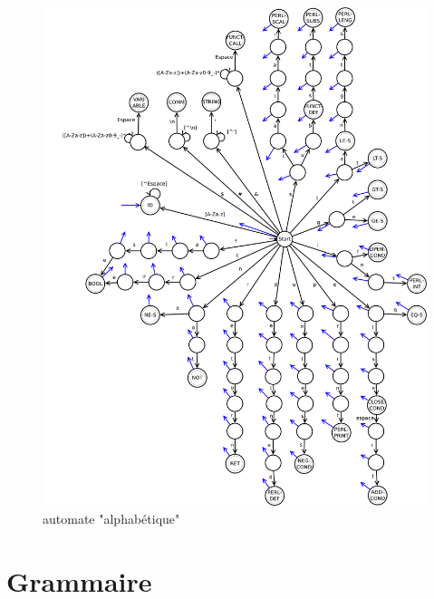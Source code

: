 \documentclass[a4paper,10pt]{article}
\begin{document}
  \begin{figure}[H] \hspace*{-2cm} 
    \centering
   	  \includegraphics[width=450pt]{automate2.pdf} 
			\caption{automate "alphabétique"}
			\label{automate2}
  \end{figure}	









\pagebreak
\section{Grammaire}
\end{document}
